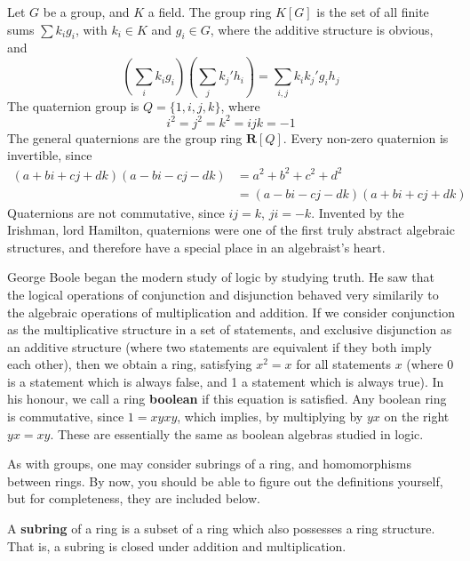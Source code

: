 \begin{example}
    Let $G$ be a group, and $K$ a field. The group ring $K[G]$ is the set of all finite sums $\sum k_i g_i$, with $k_i \in K$ and $g_i \in G$, where the additive structure is obvious, and
    \[ \left( \sum_i k_i g_i \right) \left( \sum_j k_j' h_i \right) = \sum_{i,j} k_i k_j' g_i h_j \]
    The quaternion group is $Q = \{ 1, i, j, k \}$, where
    \[ i^2 = j^2 = k^2 = ijk = -1 \]
    The general quaternions are the group ring $\mathbf{R}[Q]$. Every non-zero quaternion is invertible, since
    \begin{align*}
        (a + bi + cj + dk)(a - bi - cj - dk) &= a^2 + b^2 + c^2 + d^2\\
        &= (a - bi - cj - dk)(a + bi + cj + dk)
    \end{align*}
    Quaternions are not commutative, since $ij = k$, $ji = -k$. Invented by the Irishman, lord Hamilton, quaternions were one of the first truly abstract algebraic structures, and therefore have a special place in an algebraist's heart.
\end{example}

\begin{example}
    George Boole began the modern study of logic by studying truth. He saw that the logical operations of conjunction and disjunction behaved very similarily to the algebraic operations of multiplication and addition. If we consider conjunction as the multiplicative structure in a set of statements, and exclusive disjunction as an additive structure (where two statements are equivalent if they both imply each other), then we obtain a ring, satisfying $x^2 = x$ for all statements $x$ (where 0 is a statement which is always false, and 1 a statement which is always true). In his honour, we call a ring {\bf boolean} if this equation is satisfied. Any boolean ring is commutative, since $1 = xyxy$, which implies, by multiplying by $yx$ on the right $yx = xy$. These are essentially the same as boolean algebras studied in logic.
\end{example}

As with groups, one may consider subrings of a ring, and homomorphisms between rings. By now, you should be able to figure out the definitions yourself, but for completeness, they are included below.

\begin{definition}
    A {\bf subring} of a ring is a subset of a ring which also possesses a ring structure. That is, a subring is closed under addition and multiplication.
\end{definition}

